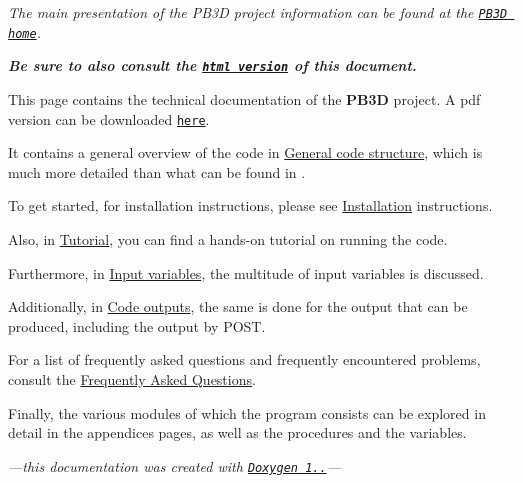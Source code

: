 {\itshape The main presentation of the P\+B3D project information can be found at the \href{https://toonweyens.github.io/PB3D}{\tt P\+B3D home}.}

 
\textit{\textbf{Be sure to also consult the \href{https://toonweyens.github.io/PB3D/Doxygen/html/index.html}{\tt html version} of this document.}}


This page contains the technical documentation of the {\bfseries P\+B3D} project. A pdf version can be downloaded \href{https://toonweyens.github.io/PB3D/PB3D_manual.pdf}{\tt here}.

It contains a general overview of the code in \hyperlink{page_overview}{General code structure}, which is much more detailed than what can be found in \cite{Weyens2017PB3D}.

To get started, for installation instructions, please see \hyperlink{page_installation}{Installation} instructions.

Also, in \hyperlink{page_tutorial}{Tutorial}, you can find a hands-\/on tutorial on running the code.

Furthermore, in \hyperlink{page_inputs}{Input variables}, the multitude of input variables is discussed.

Additionally, in \hyperlink{page_outputs}{Code outputs}, the same is done for the output that can be produced, including the output by P\+O\+ST.

For a list of frequently asked questions and frequently encountered problems, consult the \hyperlink{page_faq}{Frequently Asked Questions}.

  
Finally, the various modules of which the program consists can be explored in detail in the appendices pages, as well as the procedures and the variables.


\begin{center}{\itshape —this documentation was created with \href{http://www.doxygen.org/index.html}{\tt Doxygen 1..}—}\end{center}  